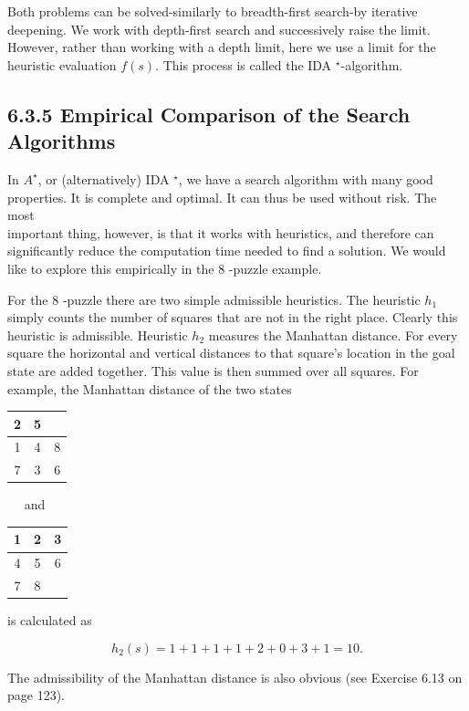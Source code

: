 \documentclass[10pt]{book}
\begin{document}
\begin{center}
Both problems can be solved-similarly to breadth-first search-by iterative deepening. We work with depth-first search and successively raise the limit. However, rather than working with a depth limit, here we use a limit for the heuristic evaluation $f(s)$. This process is called the IDA ${ }^{\star}$-algorithm.

\subsection*{6.3.5 Empirical Comparison of the Search Algorithms}
In $A^{\star}$, or (alternatively) IDA ${ }^{\star}$, we have a search algorithm with many good properties. It is complete and optimal. It can thus be used without risk. The most\\
important thing, however, is that it works with heuristics, and therefore can significantly reduce the computation time needed to find a solution. We would like to explore this empirically in the 8 -puzzle example.


For the 8 -puzzle there are two simple admissible heuristics. The heuristic $h_{1}$ simply counts the number of squares that are not in the right place. Clearly this heuristic is admissible. Heuristic $h_{2}$ measures the Manhattan distance. For every square the horizontal and vertical distances to that square's location in the goal state are added together. This value is then summed over all squares. For example, the Manhattan distance of the two states

\begin{center}
\begin{tabular}{|c|c|c|}
\hline
2 & 5 &  \\
\hline
1 & 4 & 8 \\
\hline
7 & 3 & 6 \\
\hline\hline
\end{tabular}
\end{center}$\quad$ and $\quad$\begin{tabular}{|c|c|c|}
\hline
1 & 2 & 3 \\
\hline
4 & 5 & 6 \\
\hline
7 & 8 &  \\
\hline
\end{tabular}

is calculated as

$$
h_{2}(s)=1+1+1+1+2+0+3+1=10 .
$$

The admissibility of the Manhattan distance is also obvious (see Exercise 6.13 on page 123).


\end{center}
\end{document}
